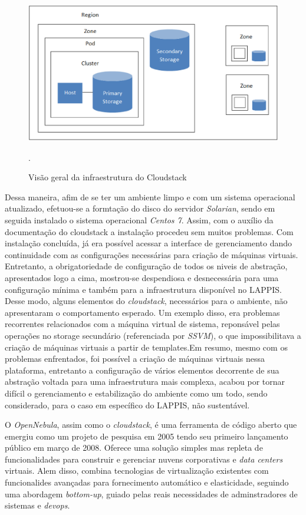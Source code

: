 \begin{figure}[!htb]
\centering
\includegraphics [keepaspectratio=true,scale=0.60]{figuras/cloudstack_structure.eps}
\caption{Visão geral da infraestrutura do Cloudstack}
\cite{cloudstack}.
\label{diagramacloudstack}
\end{figure}

Dessa maneira, afim de se ter um ambiente limpo e com um sistema operacional atualizado, efetuou-se a formtação do disco do servidor \textit{Solarian}, sendo em seguida instalado o sistema operacional \textit{Centos 7}. Assim, com o auxílio da documentação do cloudstack a instalação procedeu sem muitos problemas. Com instalação concluída, já era possível acessar a interface de gerenciamento dando continuidade com as configurações necessárias para criação de máquinas virtuais. Entretanto, a obrigatoriedade de configuração de todos os niveis de abstração, apresentados logo a cima, mostrou-se despendiosa e desnecessária para uma configuração mínima e também para a infraestrutura disponível no LAPPIS. Desse modo, alguns elementos do \textit{cloudstack}, necessários para o ambiente, não apresentaram o comportamento esperado. Um exemplo disso, era problemas recorrentes relacionados com a máquina virtual de sistema, reponsável pelas operações no storage secundário (referenciada por \textit{SSVM}), o que impossibilitava a criação de máquinas virtuais a partir de templates.Em resumo, mesmo com os problemas enfrentados, foi possível a criação de máquinas virtuais nessa plataforma, entretanto a configuração de vários elementos decorrente de sua abstração voltada para uma infraestrutura mais complexa, acabou por tornar difícil o gerenciamento e estabilização do ambiente como um todo, sendo considerado, para o caso em específico do LAPPIS, não sustentável.

O \textit{OpenNebula}, assim como o \textit{cloudstack}, é uma ferramenta de código aberto que emergiu como um projeto de pesquisa em 2005 tendo seu primeiro lançamento público em março de 2008. Oferece uma solução simples mas repleta de funcionalidades para construir e gerenciar nuvens corporativas e \textit{data centers} virtuais. Alem disso, combina tecnologias de virtualização existentes com funcionalides avançadas para fornecimento automático e elasticidade, seguindo uma abordagem \textit{bottom-up}, guiado pelas reais necessidades de adminstradores de sistemas e \textit{devops}\cite{opennebula}.

